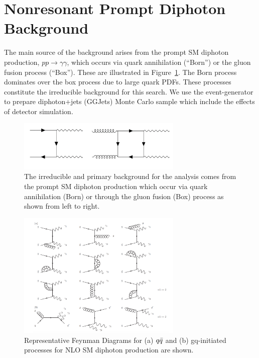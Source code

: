 \section{Nonresonant Prompt Diphoton Background}\label{sec:bkg_real}
The main source of the background arises from the prompt SM diphoton production, $pp\longrightarrow \gamma\gamma$, which occurs via quark annihilation (``Born'') or the gluon fusion process (``Box''). These are illustrated in Figure~\ref{fig:LOFeynmanBackgroundDiphoton}. The Born process dominates over the box process due to large quark PDFs. These processes constitute the irreducible background for this search. We use the \SHERPA event-generator to prepare diphoton+jets (GGJets) Monte Carlo sample which include the effects of detector simulation. 

\begin{figure}[tbp!]
\begin{center}
\includegraphics[angle=0,width=0.7\textwidth]{fig/PromptDiphotonBackground.png}
\end{center}
\caption{The irreducible and primary background for the analysis comes from the prompt SM diphoton production which occur via quark annihilation (Born) or through the gluon fusion (Box) process as shown from left to right.}
\label{fig:LOFeynmanBackgroundDiphoton}
\end{figure}


\begin{figure}[tbp!]
\begin{center}
\includegraphics[angle=0,width=0.7\textwidth]{fig/FeynmanDiagramsNLO.png}
\end{center}
\caption{ Representative Feynman Diagrams for (a) $q\Bar{q}$ and (b) gq-initiated processes for NLO SM diphoton production are shown. \cite{DErrico:2011cgc}}
\label{fig:NLOSMBackground}
\end{figure}

